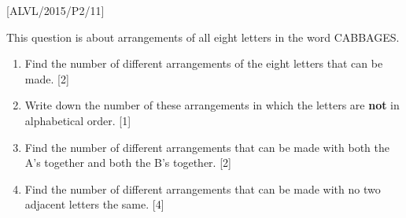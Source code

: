 \item {[}ALVL/2015/P2/11{]}

This question is about arrangements of all eight letters in the word
CABBAGES. 
\begin{enumerate}
\item Find the number of different arrangements of the eight letters that
can be made. \hfill{} {[}2{]}
\item Write down the number of these arrangements in which the letters are
\textbf{not} in alphabetical order. \hfill{} {[}1{]}
\item Find the number of different arrangements that can be made with both
the A\textquoteright s together and both the B\textquoteright s together.
\hfill{}{[}2{]}
\item Find the number of different arrangements that can be made with no
two adjacent letters the same. \hfill{} {[}4{]}
\end{enumerate}
